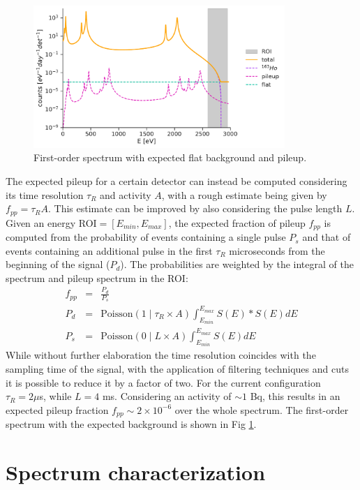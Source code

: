 \begin{figure}[t]
  \centering
  \includegraphics[width=0.85\textwidth]{figures/ch3/spectrum_0.pdf}
  \caption{First-order spectrum with expected flat background and pileup.}
  \label{fig:expected}
\end{figure}
The expected pileup for a certain detector can instead be computed considering its time resolution $\tau_R$ and activity
$A$, with a rough estimate being given by $f_{pp} = \tau_RA$. This estimate can be improved by also considering the pulse
length $L$. Given an energy ROI$=[E_{min}, E_{max}]$, the expected fraction of pileup $f_{pp}$ is computed from 
the probability of events containing a single pulse $P_s$ and that of events containing an additional pulse in
the first $\tau_R$ microseconds from the beginning of the signal ($P_{d}$). The probabilities are weighted by the
integral
of the spectrum and pileup spectrum in the ROI:
\begin{eqnarray}
f_{pp} &=& \frac{P_d}{P_s}\\
P_d &=& \text{Poisson}(1 \mid \tau_R \times A) \int_{E_{min}}^{E_{max}} S(E) * S(E) dE\\
P_s &=& \text{Poisson}(0 \mid L \times A) \int_{E_{min}}^{E_{max}} S(E) dE
\end{eqnarray}
While without further elaboration the time resolution coincides with the sampling time of the signal, with the
application of filtering techniques and cuts it is possible to reduce it by a factor of two. For the current
configuration $\tau_R = 2 \mu$s, while $L = 4$ ms. Considering an activity of $\sim 1$ Bq, this results in an expected
pileup fraction $f_{pp} \sim 2 \times 10^{-6}$ over the whole spectrum. The first-order spectrum with the expected
background is shown in Fig \ref{fig:expected}.



\section{Spectrum characterization}
